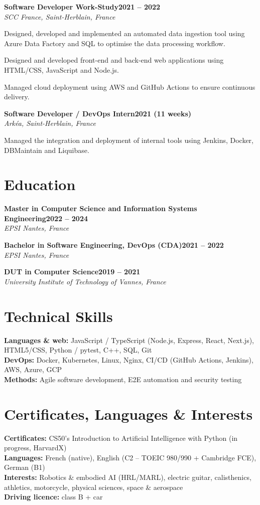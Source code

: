 \documentclass[10pt,a4paper]{article}
\newcommand{\cventry}[3]{%
	\vspace{3pt}%
	\noindent\textbf{#1}\hfill\textbf{#2}\\[1pt]
	\noindent\hspace{1.2em}\textit{#3}\par\vspace{1pt}%
}
\begin{document}
\cventry{Software Developer Work-Study}{2021 -- 2022}{SCC France, Saint-Herblain, France}
\begin{cvlist}
	\item Designed, developed and implemented an automated data ingestion tool using Azure Data Factory and SQL to optimise the data processing workflow.
	\item Designed and developed front-end and back-end web applications using HTML/CSS, JavaScript and Node.js.
	\item Managed cloud deployment using AWS and GitHub Actions to ensure continuous delivery.
\end{cvlist}

\cventry{Software Developer / DevOps Intern}{2021 (11 weeks)}{Arkéa, Saint-Herblain, France}
\begin{cvlist}
	\item Managed the integration and deployment of internal tools using Jenkins, Docker, DBMaintain and Liquibase.
\end{cvlist}

\section{Education}

\cventry{Master in Computer Science and Information Systems Engineering}{2022 -- 2024}{EPSI Nantes, France}
\cventry{Bachelor in Software Engineering, DevOps (CDA)}{2021 -- 2022}{EPSI Nantes, France}
\cventry{DUT in Computer Science}{2019 -- 2021}{University Institute of Technology of Vannes, France}

\section{Technical Skills}
\textbf{Languages \& web:} JavaScript / TypeScript (Node.js, Express, React, Next.js), HTML5/CSS, Python / pytest, C++, SQL, Git\\[2pt]
\textbf{DevOps:} Docker, Kubernetes, Linux, Nginx, CI/CD (GitHub Actions, Jenkins), AWS, Azure, GCP\\[2pt]
\textbf{Methods:} Agile software development, E2E automation and security testing

\section{Certificates, Languages \& Interests}
\textbf{Certificates:} CS50's Introduction to Artificial Intelligence with Python (in progress, HarvardX)\\[2pt]
\textbf{Languages:} French (native), English (C2 -- TOEIC 980/990 + Cambridge FCE), German (B1)\\[2pt]
\textbf{Interests:} Robotics \& embodied AI (HRL/MARL), electric guitar, calisthenics, athletics, motorcycle, physical sciences, space \& aerospace\\[2pt]
\textbf{Driving licence:} class B + car
\end{document}
